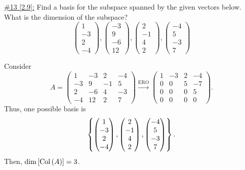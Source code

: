 \documentclass{exam}
\begin{document}
\underline{\#13 [2.9]:} Find a basis for the subspace spanned by the given vectors below. What is the dimension of the subspace?
\[
    \begin{pmatrix}
        1 \\ -3 \\ 2 \\ -4
    \end{pmatrix},
    \begin{pmatrix}
        -3 \\ 9 \\ -6 \\ 12
    \end{pmatrix},
    \begin{pmatrix}
        2 \\ -1 \\ 4 \\ 2
    \end{pmatrix},
    \begin{pmatrix}
        -4 \\ 5 \\ -3 \\ 7
    \end{pmatrix}
\]
\begin{solution}
    Consider 
    \[
        A = \begin{pmatrix}
            1 & -3 & 2 & -4 \\
            -3 & 9 & -1 & 5 \\
            2 & -6 & 4 & -3 \\
            -4 & 12 & 2 & 7
        \end{pmatrix} 
        \xrightarrow{\text{ERO}}
        \begin{pmatrix}
            1 & -3 & 2 & -4 \\
            0 & 0 & 5 & -7 \\
            0 & 0 & 0 & 5 \\
            0 & 0 & 0 & 0
        \end{pmatrix}.
    \]
    Thus, one possible basis is 
    \[
        \left\{
            \begin{pmatrix}
                1 \\ -3 \\ 2 \\ -4
            \end{pmatrix},
            \begin{pmatrix}
                2 \\ -1 \\ 4 \\ 2
            \end{pmatrix},
            \begin{pmatrix}
                -4 \\ 5 \\ -3 \\ 7
            \end{pmatrix}
         \right\}.
    \]
    Then, $\dim\left[\text{Col}\left(A\right)\right] = 3$.
\end{solution}
\end{document}
